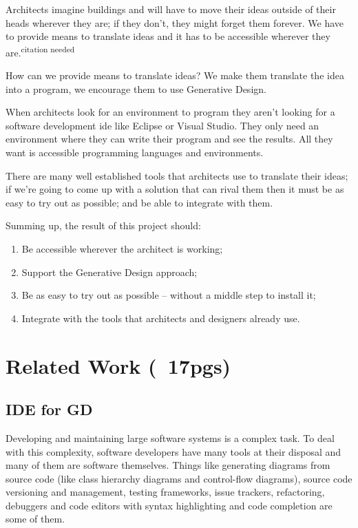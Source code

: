 \documentclass{./llncs2e/llncs}
\begin{document}
	Architects imagine buildings and will have to move their ideas outside of their heads wherever they are; if they don't, they might forget them forever. 
	We have to provide means to translate ideas and it has to be accessible wherever they are.\textsuperscript{citation needed}

	How can we provide means to translate ideas? We make them translate the idea into a program, we encourage them to use Generative Design.

	When architects look for an environment to program they aren't looking for a software development \ac{ide} like Eclipse or Visual Studio. 
	They only need an environment where they can write their program and see the results. 
	All they want is accessible programming languages and environments.

	There are many well established tools that architects use to translate their ideas; 
	if we're going to come up with a solution that can rival them then it must be as easy to try out as possible; 
	and be able to integrate with them.

	Summing up, the result of this project should:
	\begin{enumerate}
		\item Be accessible wherever the architect is working; \label{obj:access}
		\item Support the Generative Design approach; \label{obj:gen-design}
		\item Be as easy to try out as possible -- without a middle step to install it; \label{obj:no-install}
		\item Integrate with the tools that architects and designers already use.\label{obj:inter-op}
	\end{enumerate}


\section{Related Work (~17pgs)}

\subsection{IDE for GD}
	Developing and maintaining large software systems is a complex task.
	To deal with this complexity, software developers have many tools at their disposal and many of them are software themselves.
	Things like generating diagrams from source code (like class hierarchy diagrams and control-flow diagrams), source code versioning and management, testing frameworks, issue trackers, refactoring, debuggers and code editors with syntax highlighting and code completion are some of them.
\end{document}
